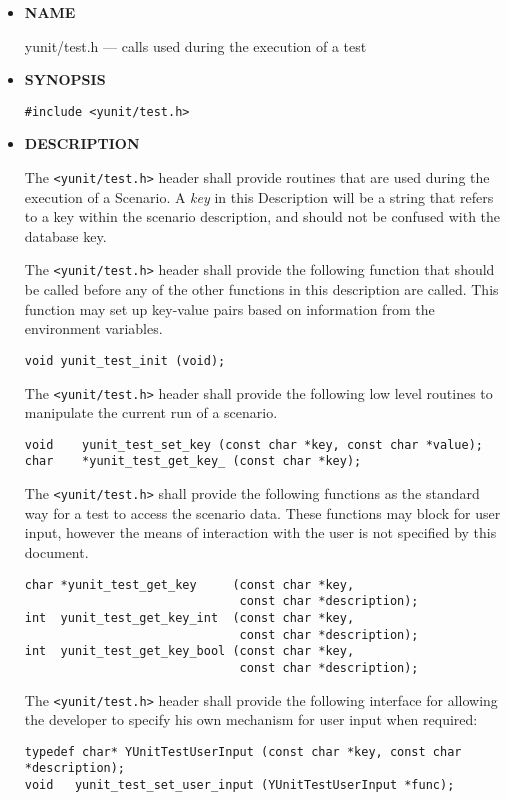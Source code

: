\documentclass{article}
\begin{document}
\begin{itemize}
\item {\bf NAME}

yunit/test.h --- calls used during the execution of a test

\item {\bf SYNOPSIS}

\verb|#include <yunit/test.h>|

\item {\bf DESCRIPTION}

The \verb|<yunit/test.h>| header shall provide routines that are used
during the execution of a Scenario. A \emph{key} in this Description
will be a string that refers to a key within the scenario description,
and should not be confused with the database key.

The \verb|<yunit/test.h>| header shall provide the following function
that should be called before any of the other functions in this
description are called. This function may set up key-value pairs
based on information from the environment variables.

\begin{verbatim}
void yunit_test_init (void);
\end{verbatim}
The \verb|<yunit/test.h>| header shall provide the following low level
routines to manipulate the current run of a scenario.

\begin{verbatim}
void    yunit_test_set_key (const char *key, const char *value);
char    *yunit_test_get_key_ (const char *key);
\end{verbatim}

The \verb|<yunit/test.h>| shall provide the following functions as the
standard way for a test to access the scenario data. These functions
may block for user input, however the means of interaction with the
user is not specified by this document.

\begin{verbatim}
char *yunit_test_get_key     (const char *key,
                              const char *description);
int  yunit_test_get_key_int  (const char *key,
                              const char *description);
int  yunit_test_get_key_bool (const char *key,
                              const char *description);
\end{verbatim}

The \verb|<yunit/test.h>| header shall provide the following interface
for allowing the developer to specify his own mechanism for user input
when required:

\begin{verbatim}
typedef char* YUnitTestUserInput (const char *key, const char
*description);
void   yunit_test_set_user_input (YUnitTestUserInput *func);
\end{verbatim}


\end{itemize}
\end{document}
